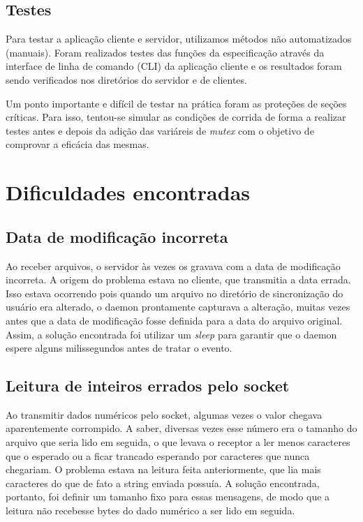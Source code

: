 \documentclass[a4paper]{article}
\begin{document}
\subsection{Testes}
Para testar a aplicação cliente e servidor, utilizamos métodos não automatizados (manuais). Foram realizados testes das funções da especificação através da interface de linha de comando (CLI) da aplicação cliente e os resultados foram sendo verificados nos diretórios do servidor e de clientes.

Um ponto importante e difícil de testar na prática foram as proteções de seções críticas. Para isso, tentou-se simular as condições de corrida de forma a realizar testes antes e depois da adição das variáreis de \textit{mutex} com o objetivo de comprovar a eficácia das mesmas.

\section{Dificuldades encontradas}

\subsection{Data de modificação incorreta}
Ao receber arquivos, o servidor às vezes os gravava com a data de modificação incorreta. A origem do problema estava no cliente, que transmitia a data errada. Isso estava ocorrendo pois quando um arquivo no diretório de sincronização do usuário era alterado, o daemon prontamente capturava a alteração, muitas vezes antes que a data de modificação fosse definida para a data do arquivo original. Assim, a solução encontrada foi utilizar um \textit{sleep} para garantir que o daemon espere alguns milissegundos antes de tratar o evento.

\subsection{Leitura de inteiros errados pelo socket}
Ao transmitir dados numéricos pelo socket, algumas vezes o valor chegava aparentemente corrompido. A saber, diversas vezes esse número era o tamanho do arquivo que seria lido em seguida, o que levava o receptor a ler menos caracteres que o esperado ou a ficar trancado esperando por caracteres que nunca chegariam. O problema estava na leitura feita anteriormente, que lia mais caracteres do que de fato a string enviada possuía. A solução encontrada, portanto, foi definir um tamanho fixo para essas mensagens, de modo que a leitura não recebesse bytes do dado numérico a ser lido em seguida.
\end{document}
